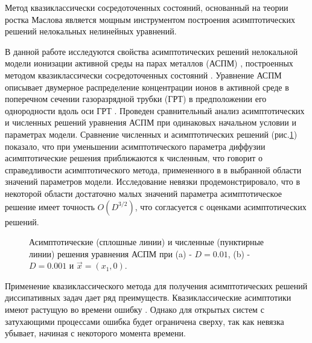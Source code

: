 
Метод квазиклассически сосредоточенных состояний, основанный на теории ростка Маслова является мощным инструментом построения асимптотических решений нелокальных нелинейных уравнений.

В данной работе исследуются свойства асимптотических решений нелокальной модели ионизации активной среды на парах металлов (АСПМ) \cite{Little}, построенных методом квазиклассически сосредоточенных состояний \cite{ShKulSin}. Уравнение АСПМ описывает двумерное распределение концентрации ионов в активной среде в поперечном сечении газоразрядной трубки (ГРТ) в предположении его однородности вдоль оси ГРТ \cite{CarBrPip}.  Проведен сравнительный анализ асимптотических и численных решений уравнения АСПМ при одинаковых начальном условии и параметрах модели. Сравнение численных и асимптотических решений (рис.\ref{fig1}) показало, что при уменьшении асимптотического параметра диффузии асимптотические решения приближаются к численным, что говорит о справедливости асимптотического метода, примененного в  \cite{ShKulSin} в выбранной области значений параметров модели. Исследование невязки продемонстрировало, что в некоторой области достаточно малых значений параметра   асимптотическое решение имеет точность $O(D^{3/2})$, что согласуется с оценками асимптотических решений.




\begin{figure}[htb]
  \centering

  \begin{center}
  \end{center}
  \caption{Асимптотические (сплошные линии) и численные (пунктирные линии) решения уравнения АСПМ при (a) - $D=0.01$, (b) - $D=0.001$ и $\Vec{x}=(x_1,0)$.}\label{fig1}
\end{figure}


Применение квазиклассического метода для получения асимптотических решений диссипативных задач дает ряд преимуществ. Квазиклассические асимптотики имеют растущую во времени ошибку \cite{HagJo}. Однако для открытых систем с затухающими процессами ошибка будет ограничена сверху, так как невязка убывает, начиная с некоторого момента времени.

